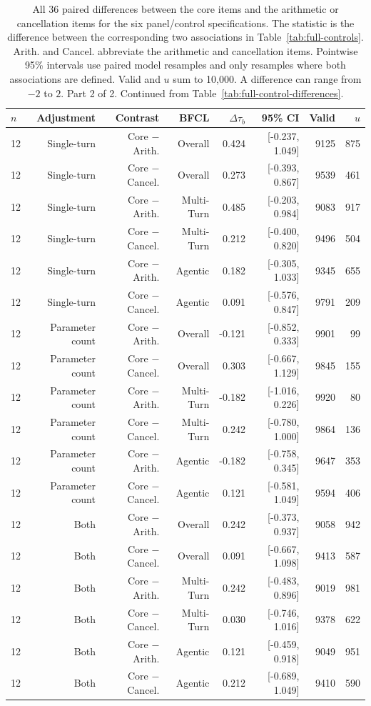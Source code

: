 \begin{table}[t]
\centering
\footnotesize
\setlength{\tabcolsep}{3pt}
\begin{tabular}{lrrrrrrr}
\toprule
$n$ & Adjustment & Contrast & BFCL & $\Delta\tau_b$ & 95\% CI & Valid & $u$ \\
\midrule
12 & Single-turn & Core $-$ Arith. & Overall & 0.424 & [-0.237, 1.049] & 9125 & 875 \\
12 & Single-turn & Core $-$ Cancel. & Overall & 0.273 & [-0.393, 0.867] & 9539 & 461 \\
12 & Single-turn & Core $-$ Arith. & Multi-Turn & 0.485 & [-0.203, 0.984] & 9083 & 917 \\
12 & Single-turn & Core $-$ Cancel. & Multi-Turn & 0.212 & [-0.400, 0.820] & 9496 & 504 \\
12 & Single-turn & Core $-$ Arith. & Agentic & 0.182 & [-0.305, 1.033] & 9345 & 655 \\
12 & Single-turn & Core $-$ Cancel. & Agentic & 0.091 & [-0.576, 0.847] & 9791 & 209 \\
12 & Parameter count & Core $-$ Arith. & Overall & -0.121 & [-0.852, 0.333] & 9901 & 99 \\
12 & Parameter count & Core $-$ Cancel. & Overall & 0.303 & [-0.667, 1.129] & 9845 & 155 \\
12 & Parameter count & Core $-$ Arith. & Multi-Turn & -0.182 & [-1.016, 0.226] & 9920 & 80 \\
12 & Parameter count & Core $-$ Cancel. & Multi-Turn & 0.242 & [-0.780, 1.000] & 9864 & 136 \\
12 & Parameter count & Core $-$ Arith. & Agentic & -0.182 & [-0.758, 0.345] & 9647 & 353 \\
12 & Parameter count & Core $-$ Cancel. & Agentic & 0.121 & [-0.581, 1.049] & 9594 & 406 \\
12 & Both & Core $-$ Arith. & Overall & 0.242 & [-0.373, 0.937] & 9058 & 942 \\
12 & Both & Core $-$ Cancel. & Overall & 0.091 & [-0.667, 1.098] & 9413 & 587 \\
12 & Both & Core $-$ Arith. & Multi-Turn & 0.242 & [-0.483, 0.896] & 9019 & 981 \\
12 & Both & Core $-$ Cancel. & Multi-Turn & 0.030 & [-0.746, 1.016] & 9378 & 622 \\
12 & Both & Core $-$ Arith. & Agentic & 0.121 & [-0.459, 0.918] & 9049 & 951 \\
12 & Both & Core $-$ Cancel. & Agentic & 0.212 & [-0.689, 1.049] & 9410 & 590 \\
\bottomrule
\end{tabular}
\caption{All 36 paired differences between the core items and the arithmetic or cancellation items for the six panel/control specifications. The statistic is the difference between the corresponding two associations in Table~\ref{tab:full-controls}. Arith. and Cancel. abbreviate the arithmetic and cancellation items. Pointwise 95\% intervals use paired model resamples and only resamples where both associations are defined. Valid and $u$ sum to 10,000. A difference can range from $-2$ to $2$. Part 2 of 2. Continued from Table~\ref{tab:full-control-differences}.}
\label{tab:full-control-differences:continued-2}
\end{table}
